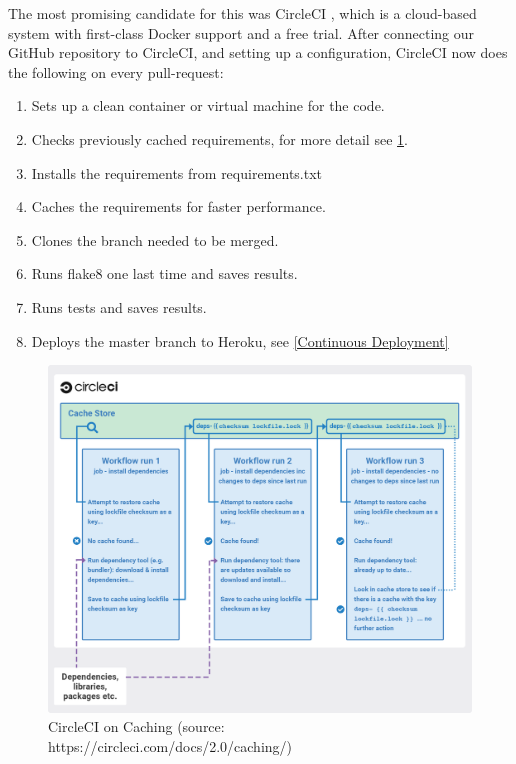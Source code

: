 \documentclass[main.tex]{subfiles}
\begin{document}
The most promising candidate for this was CircleCI \cite{CircleCI}, which is a cloud-based system with first-class Docker support and a free trial. After connecting our GitHub repository to CircleCI, and setting up a configuration, CircleCI now does the following on every pull-request:

\begin{enumerate}
    \item Sets up a clean container or virtual machine for the code.
    \item Checks previously cached requirements, for more detail see \figurename{\ref{cache_CI}}.
    \item Installs the requirements from requirements.txt
    \item Caches the requirements for faster performance.
    \item Clones the branch needed to be merged.
    \item Runs flake8 one last time and saves results.
    \item Runs tests and saves results.
    \item Deploys the master branch to Heroku, see \ref{Continuous Deployment}
\end{enumerate}

 \begin{figure}[H]
   \centering
   \includegraphics[width=\textwidth]{05Coding/05Pictures/cache_CI.png}
   \caption{CircleCI on Caching (source: https://circleci.com/docs/2.0/caching/)}
   \label{cache_CI}
\end{figure}
\end{document}
